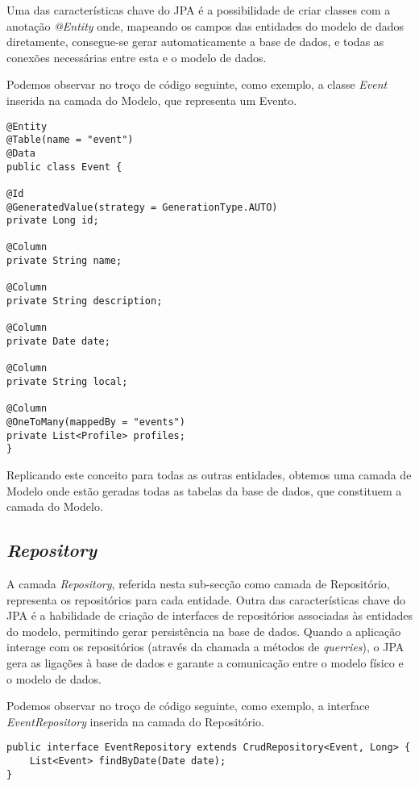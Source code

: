 Uma das características chave do JPA é a possibilidade de criar classes com a anotação \emph{@Entity} onde, mapeando os campos das entidades do modelo de dados diretamente, consegue-se gerar automaticamente a base de dados, e todas as conexões necessárias entre esta e o modelo de dados. 

Podemos observar no troço de código seguinte, como exemplo, a classe \emph{Event} inserida na camada do Modelo, que representa um Evento.


\begin{verbatim}
@Entity
@Table(name = "event")
@Data
public class Event {

@Id
@GeneratedValue(strategy = GenerationType.AUTO)
private Long id;

@Column
private String name;

@Column
private String description;

@Column
private Date date;

@Column
private String local;

@Column
@OneToMany(mappedBy = "events")
private List<Profile> profiles;
}
\end{verbatim}

Replicando este conceito para todas as outras entidades, obtemos uma camada de Modelo onde estão geradas todas as tabelas da base de dados, que constituem a camada do Modelo.

\subsection{\emph{Repository}} \label{sec312}
A camada \emph{Repository}, referida nesta sub-secção como camada de Repositório, representa os repositórios para cada entidade. 
Outra das características chave do JPA é a habilidade de criação de interfaces de repositórios associadas às entidades do modelo, permitindo gerar persistência na base de dados. Quando a aplicação interage com os repositórios (através da chamada a métodos de \emph{querries}), o JPA gera as ligações à base de dados e garante a comunicação entre o modelo físico e o modelo de dados.

Podemos observar no troço de código seguinte, como exemplo, a interface \emph{EventRepository} inserida na camada do Repositório.

\begin{verbatim}
public interface EventRepository extends CrudRepository<Event, Long> {
	List<Event> findByDate(Date date);
}
\end{verbatim}

